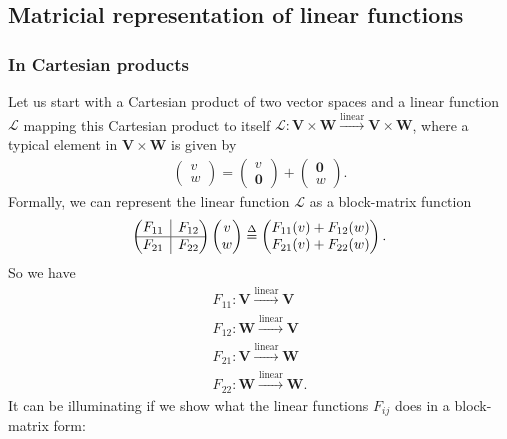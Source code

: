 \documentclass{article}
\theoremstyle{definition}
\newcommand{\V}{\mathbf{V}}
\newcommand{\W}{\mathbf{W}}
\newcommand{\lag}{\mathcal{L}}
\newcommand{\lin}{\overset{\text{linear}}{\longrightarrow}}
\newcommand{\rvline}{\hspace*{-\arraycolsep}\vline\hspace*{-\arraycolsep}}
\begin{document}
\subsection{Matricial representation of linear functions}

\subsubsection{In Cartesian products}

Let us start with a Cartesian product of two vector spaces and a linear function $\lag$ mapping this Cartesian product to itself $\lag : \V \times \W \lin \V \times \W$, where a typical element in $\V\times \W$ is given by
\begin{align*}
\begin{pmatrix}
v\\w
\end{pmatrix} = \begin{pmatrix}
v\\ \mathbf{0}
\end{pmatrix} + \begin{pmatrix}
\mathbf{0} \\ w
\end{pmatrix}.
\end{align*}
Formally, we can represent the linear function $\lag$ as a block-matrix function
\begin{align*}
\begin{pmatrix}
\begin{matrix}
F_{11}
\end{matrix}
& \rvline & F_{12} \\
\hline
F_{21} & \rvline &
F_{22}
\end{pmatrix}\begin{pmatrix}
v\\w
\end{pmatrix} \stackrel{\Delta}{=} \begin{pmatrix}
F_{11}(v) + F_{12}(w)\\
F_{21}(v) + F_{22}(w)
\end{pmatrix}.
\end{align*}
So we have 
\begin{align*}
F_{11} : \V \lin \V\\
F_{12} : \W \lin \V\\
F_{21} : \V \lin \W\\
F_{22} : \W \lin \W.
\end{align*}
It can be illuminating if we show what the linear functions $F_{ij}$ does in a block-matrix form:
\end{document}
